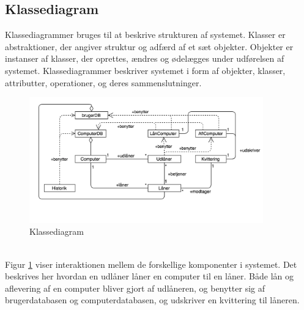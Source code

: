 \documentclass[a4paper]{article}
\begin{document}
\subsection{Klassediagram}
Klassediagrammer bruges til at beskrive strukturen af systemet. Klasser er abstraktioner, der angiver struktur og adfærd af et sæt objekter. Objekter er instanser af klasser, der oprettes, ændres og ødelægges under udførelsen af systemet. Klassediagrammer beskriver systemet i form af objekter, klasser, attributter, operationer, og deres sammenslutninger. \cite[p~30]{OOSE} 
\begin{figure}[h!]
\includegraphics[width=0.9\textwidth]{Klassediagram}
  \caption{Klassediagram}
    \label{fig:KLS}
  \centering
\end{figure}\\
Figur \ref{fig:KLS} viser interaktionen mellem de forskellige komponenter i systemet. Det beskrives her hvordan en udlåner låner en computer til en låner. Både lån og aflevering af en computer bliver gjort af udlåneren, og benytter sig af brugerdatabasen og computerdatabasen, og udskriver en kvittering til låneren.
\newpage
\end{document}
